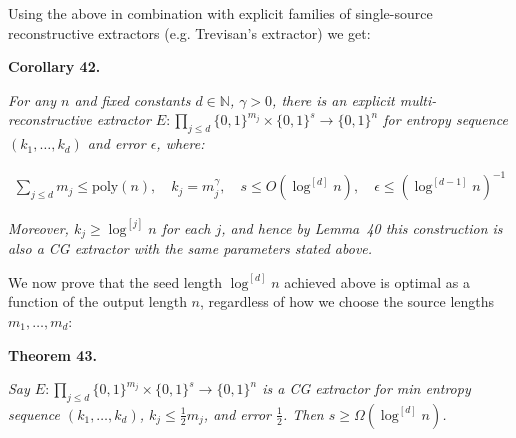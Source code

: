 \documentclass[10pt,a4paper]{article}
\begin{document}
Using the above in combination with explicit families of single-source reconstructive extractors (e.g. Trevisan’s extractor) we get:\par





\par\medskip\noindent\textbf{
\textbf{Corollary 42}\textbf{.}
}\par



\emph{For any $n$ and fixed constants $d\in\mathbb{N}$, $\gamma>0$, there is an explicit multi-reconstructive extractor $E:\prod_{j\leq d}\{0,1\}^{m_{j}}\times\{0,1\}^{s}\to\{0,1\}^{n}$ for entropy sequence $(k_{1},\ldots,k_{d})$ and error $\epsilon$, where:}\par


\[\begin{gathered}
\sum_{j\leq d}m_{j}\leq\mathrm{poly}(n),\quad k_{j}=m_{j}^{\gamma},\quad s\leq
O(\log^{[d]}n),\quad\epsilon\leq(\log^{[d-1]}n)^{-1}
\end{gathered}\]


\emph{Moreover, $k_{j}\geq\log^{[j]}n$ for each $j$, and hence by Lemma 40 this construction is also a CG extractor with the same parameters stated above.}\par






We now prove that the seed length $\log^{[d]}n$ achieved above is optimal as a function of the output length $n$, regardless of how we choose the source lengths $m_{1},\ldots,m_{d}$:\par






\par\medskip\noindent\textbf{
\textbf{Theorem 43}\textbf{.}
}\par



\emph{Say $E:\prod_{j\leq d}\{0,1\}^{m_{j}}\times\{0,1\}^{s}\to\{0,1\}^{n}$ is a CG extractor for min entropy sequence $(k_{1},\ldots,k_{d})$, $k_{j}\leq\frac{1}{2}m_{j}$, and error $\frac{1}{2}$. Then $s\geq\Omega(\log^{[d]}n)$.}\par



\end{document}
